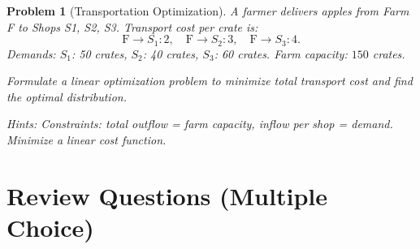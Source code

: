 \documentclass[11pt]{article}
\theoremstyle{upright}
\newtheorem{problem}{Problem}
\begin{document}
\begin{problem}[Transportation Optimization]
A farmer delivers apples from Farm F to Shops S1, S2, S3. Transport cost per crate is:
\[
\text{F}\to S_1: 2, \quad
\text{F}\to S_2: 3, \quad
\text{F}\to S_3: 4.
\]
Demands: $S_1$: 50 crates, $S_2$: 40 crates, $S_3$: 60 crates. Farm capacity: $150$ crates.

Formulate a linear optimization problem to minimize total transport cost and find the optimal distribution.

\textit{Hints:}  
Constraints: total outflow = farm capacity, inflow per shop = demand. Minimize a linear cost function.
\end{problem}
\section*{Review Questions (Multiple Choice)}
\end{document}

